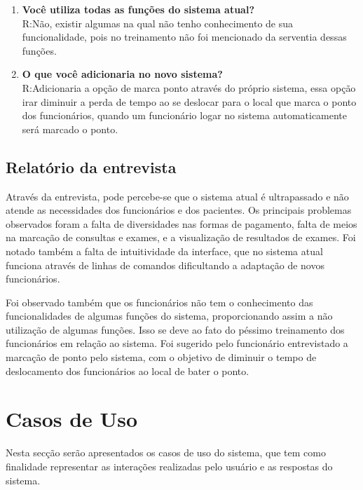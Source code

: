 \begin{enumerate}
  \item \textbf{Você utiliza todas as funções do sistema atual?}
  \\R:Não, existir algumas na qual não tenho conhecimento de sua funcionalidade, pois no treinamento não foi mencionado da serventia dessas funções. \\

  \item \textbf{O que você adicionaria no novo sistema?}
  \\R:Adicionaria a opção de marca ponto através do próprio sistema, essa opção irar diminuir a perda de tempo ao se deslocar para o local que marca o ponto dos funcionários, quando um funcionário logar no sistema automaticamente será marcado o ponto.
\end{enumerate}

\subsection{Relatório da entrevista}
    
Através da entrevista, pode percebe-se que o sistema atual é ultrapassado e não atende as necessidades dos funcionários e dos pacientes. Os principais problemas observados foram a falta de diversidades nas formas de pagamento, falta de meios na marcação de consultas e exames, e a visualização de resultados de exames. Foi notado também a falta de intuitividade da interface, que no sistema atual funciona através de linhas de comandos dificultando a adaptação de novos funcionários.
    
Foi observado também que os funcionários não tem o conhecimento das funcionalidades de algumas funções do sistema, proporcionando assim a não utilização de algumas funções. Isso se deve ao fato do péssimo treinamento dos funcionários em relação ao sistema. Foi sugerido pelo funcionário entrevistado a marcação de ponto pelo sistema, com o objetivo de diminuir o tempo de deslocamento dos funcionários ao local de bater o ponto.




\section{ Casos de Uso}
Nesta secção serão apresentados os casos de uso do sistema, que tem como finalidade representar as interações realizadas pelo usuário e as respostas do sistema.
